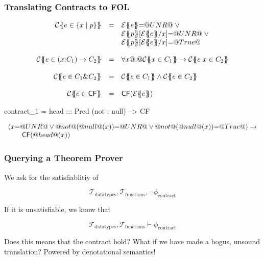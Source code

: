 \documentclass[serif,professionalfont]{beamer}
\begin{document}
\newcommand\formula[1]{#1}
\newcommand\highlight[1]{#1}
\newcommand{\etrans}[3]{{\cal E}\{\!\!\{#3\}\!\!\}}
\newcommand{\trc}[1]{{\cal C}\{\!\!\{#1\}\!\!\}}

\begin{frame}[fragile]
  \frametitle{Translating Contracts to FOL}
\[\begin{array}{rcl}
\trc{e \in \{x \mid p \}}
  & = &      \etrans{}{}{e} {=} \unr \; \lor \; \\
  &   &      \etrans{}{}{p}[\etrans{}{}{e}/x] {=} \unr \; \lor \; \\
  &   &      \etrans{}{}{p}[\etrans{}{}{e}/x] {=} \True
\\ \\
\trc{e \in (x{:}C_1) \to C_2}
  & = & \formula{\forall x @.@  \trc{x \in C_1} \to \trc{e\;x \in C_2}}
\\ \\
\trc{e \in C_1 \& C_2}
   & = & \formula{ \trc{e \in C_1} \land \trc{e \in C_2}}
\\ \\
\trc{e \in \cf} & = & \formula{\cf({\etrans{\Sigma}{\Gamma}{e}})} \\
\end{array}\]

\begin{code}
  contract_1 = head ::: Pred (not . null) --> CF
\end{code}

\[\begin{array}{l}
(x{=}@UNR@ \lor @not@(@null@(x)){=}@UNR@ \lor @not@(@null@(x)){=}@True@) \to \\
\qquad \mathsf{CF}(@head@(x))
\end{array}\]
\end{frame}

\begin{frame}[fragile]
  \frametitle{Querying a Theorem Prover}

  We ask for the satisfiablitiy of

  $$
    \mathcal{T}_{\text{datatypes}}, \mathcal{T}_{\text{functions}} ,
    \neg \phi_{\text{contract}}
  $$

  If it is unsatisfiable, we know that

  $$
    \mathcal{T}_{\text{datatypes}}, \mathcal{T}_{\text{functions}} \vdash
    \phi_{\text{contract}}
  $$

  Does this means that the contract hold? What if we have made a
  bogus, unsound translation? Powered by denotational semantics!

\end{frame}
\end{document}
